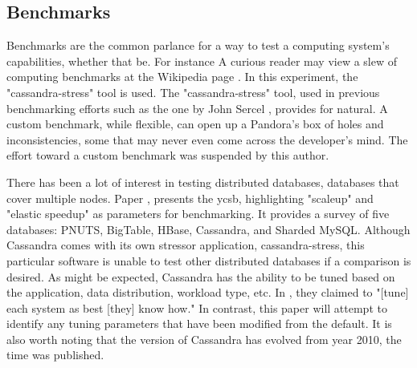 \subsection{Benchmarks}

Benchmarks are the common parlance for a way to test a computing system's capabilities, whether that be.  
For instance 
A curious reader may view a slew of computing benchmarks at the Wikipedia page \cite{Category:ComputerEncyclopedia}.
In this experiment, the "cassandra-stress" \cite{DatastaxTheTool} tool is used.
The "cassandra-stress" tool, used in previous benchmarking efforts such as the one by John Sercel \cite{SercelCassandraMedium}, provides for natural.
A custom benchmark, while flexible, can open up a Pandora's box of holes and inconsistencies, some that may never even come across the developer's mind.
The effort toward a custom benchmark was suspended by this author.

There has been a lot of interest in testing distributed databases, databases that cover multiple nodes.
Paper \cite{Cooper2010BenchmarkingYCSB}, presents the \gls{ycsb}, highlighting "scaleup" and "elastic speedup" as parameters for benchmarking.
It provides a survey of five databases: PNUTS, BigTable, HBase, Cassandra, and Sharded MySQL.
Although Cassandra comes with its own stressor application, cassandra-stress, this particular software is unable to test other distributed databases if a comparison is desired.
As might be expected, Cassandra has the ability to be tuned based on the application, data distribution, workload type, etc.
In \cite{Cooper2010BenchmarkingYCSB}, they claimed to "[tune] each system as best [they] know how."
In contrast, this paper will attempt to identify any tuning parameters that have been modified from the default.
It is also worth noting that the version of Cassandra has evolved from year 2010, the time \cite{Cooper2010BenchmarkingYCSB} was published.

